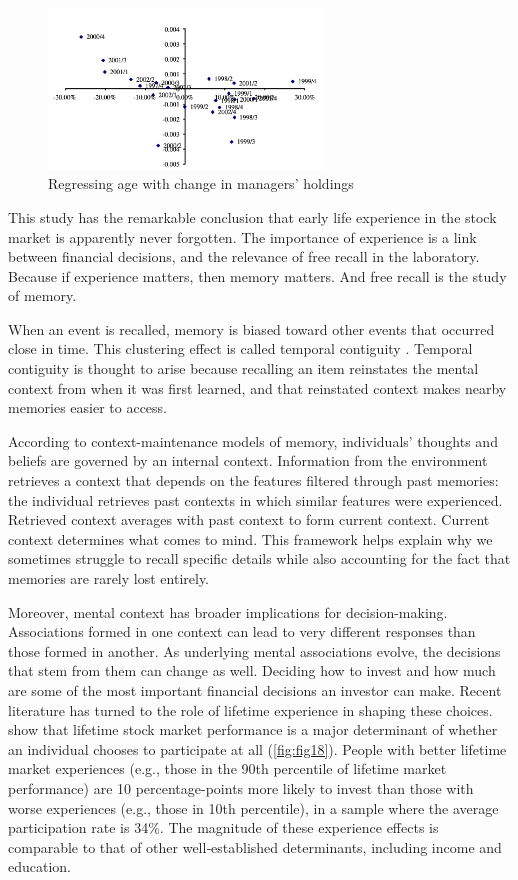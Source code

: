\begin{figure}[h]
    \centering
    \includegraphics[width=0.65\textwidth]{fig17.png}
    \caption{Regressing age with change in managers' holdings \citep{greenwood2009inexperienced}}
    \label{fig:fig17}
\end{figure}

This study has the remarkable conclusion that early life experience in the stock market is apparently never forgotten. The importance of experience is a link between financial decisions, and the relevance of free recall in the laboratory. Because if experience matters, then memory matters. And free recall is the study of memory.

When an event is recalled, memory is biased toward other events that occurred close in time. This clustering effect is called temporal contiguity \citep{howard2002distributed}. Temporal contiguity is thought to arise because recalling an item reinstates the mental context from when it was first learned, and that reinstated context makes nearby memories easier to access.

According to context-maintenance models of memory, individuals’ thoughts and beliefs are governed by an internal context. Information from the environment retrieves a context that depends on the features filtered through past memories: the individual retrieves past contexts in which similar features were experienced. Retrieved context averages with past context to form current context. Current context determines what comes to mind. This framework helps explain why we sometimes struggle to recall specific details while also accounting for the fact that memories are rarely lost entirely.

Moreover, mental context has broader implications for decision-making. Associations formed in one context can lead to very different responses than those formed in another. As underlying mental associations evolve, the decisions that stem from them can change as well. Deciding how to invest and how much are some of the most important financial decisions an investor can make. Recent literature has turned to the role of lifetime experience in shaping these choices. \citet{malmendier2021memory} show that lifetime stock market performance is a major determinant of whether an individual chooses to participate at all (\autoref{fig:fig18}). People with better lifetime market experiences (e.g., those in the 90th percentile of lifetime market performance) are 10 percentage-points more likely to invest than those with worse experiences (e.g., those in 10th percentile), in a sample where the average participation rate is 34\%. The magnitude of these experience effects is comparable to that of other well‑established determinants, including income and education.

